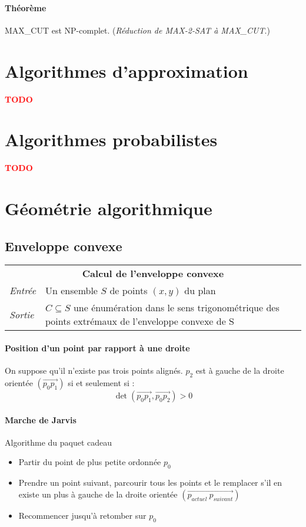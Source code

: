 \documentclass[french]{article}
\newcommand{\TODO}{\textcolor{red}{\textbf{TODO}}}
\begin{document}
\paragraph{Théorème} MAX\_CUT est NP-complet. (\emph{Réduction de MAX-2-SAT à MAX\_CUT}.)

\section{Algorithmes d'approximation}

\TODO

\section{Algorithmes probabilistes}

\TODO

\section{Géométrie algorithmique}

\subsection{Enveloppe convexe}

\vspace{0.5cm}
\begin{tabularx}{\textwidth}{p{1cm}X}
\multicolumn{2}{c}{\textbf{Calcul de l'enveloppe convexe}} \\ 
\emph{Entrée} & Un ensemble $S$ de points $(x,y)$ du plan \\ 
\emph{Sortie} & $C \subseteq S$ une énumération dans le sens trigonométrique des points extrémaux de l'enveloppe convexe de S \\
\end{tabularx}

\paragraph{Position d'un point par rapport à une droite} On suppose qu'il n'existe pas trois points alignés. $p_2$ est à gauche de la droite orientée $(\vec{p_0p_1})$ si et seulement si :
 \[ \det(\vec{p_0p_1}, \vec{p_0p_2}) > 0 \]
 
\paragraph{Marche de Jarvis} Algorithme du paquet cadeau
\begin{itemize}
	\item Partir du point de plus petite ordonnée $p_0$
	\item Prendre un point suivant, parcourir tous les points et le remplacer s'il en existe un plus à gauche de la droite orientée $(\vec{p_{actuel}~p_{suivant}})$
	\item Recommencer jusqu'à retomber sur $p_0$
\end{itemize}
\end{document}
